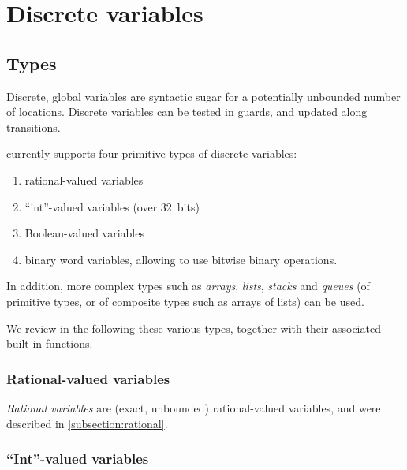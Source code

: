 \section{Discrete variables}\label{section:discrete}


\subsection{Types}

Discrete, global variables are syntactic sugar for a potentially unbounded number of locations.
Discrete variables can be tested in guards, and updated along transitions.

\imitator{} currently supports four primitive types of discrete variables:
\begin{enumerate}
	\item rational-valued variables
	\item ``int''-valued variables (over 32~bits)
	\item Boolean-valued variables
	\item binary word variables, allowing to use bitwise binary operations.
\end{enumerate}

In addition, more complex types such as \emph{arrays}, \emph{lists}, \emph{stacks} and \emph{queues} (of primitive types, or of composite types such as arrays of lists) can be used.

We review in the following these various types, together with their associated built-in functions.


\subsubsection{Rational-valued variables}

\emph{Rational variables} are (exact, unbounded) rational-valued variables, and were described in \cref{subsection:rational}.

\subsubsection{``Int''-valued variables}

